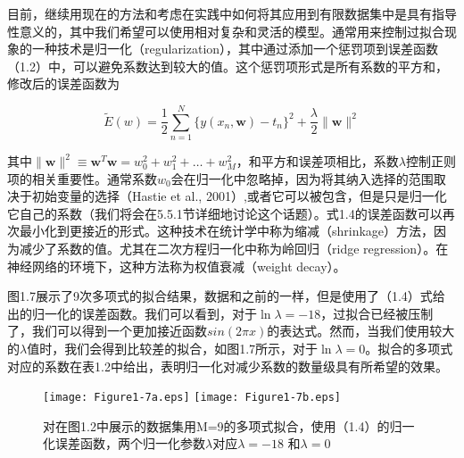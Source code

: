 	目前，继续用现在的方法和考虑在实践中如何将其应用到有限数据集中是具有指导性意义的，其中我们希望可以使用相对复杂和灵活的模型。通常用来控制过拟合现象的一种技术是归一化（regularization），其中通过添加一个惩罚项到误差函数（1.2）中，可以避免系数达到较大的值。这个惩罚项形式是所有系数的平方和，修改后的误差函数为
	
	\begin{equation}
	\tilde{E}(w) = \frac{1}{2} \sum_{n = 1}^{N}\{ y(x_n,\mathbf{w}) - t_n\}^2 + \frac{\lambda}{2} \parallel \mathbf{w} \parallel^2
	\end{equation}
	
	其中$\parallel \mathbf{w} \parallel^2 \equiv \mathbf{w}^T\mathbf{w} = w_0^2 + w_1^2 + \dots +w_M^2 $，和平方和误差项相比，系数$\lambda$控制正则项的相关重要性。通常系数$w_0$会在归一化中忽略掉，因为将其纳入选择的范围取决于初始变量的选择（Hastie et al., 2001）,或者它可以被包含，但是只是归一化它自己的系数（我们将会在5.5.1节详细地讨论这个话题）。式1.4的误差函数可以再次最小化到更接近的形式。这种技术在统计学中称为缩减（shrinkage）方法，因为减少了系数的值。尤其在二次方程归一化中称为岭回归（ridge regression）。在神经网络的环境下，这种方法称为权值衰减（weight decay）。
	
	图1.7展示了9次多项式的拟合结果，数据和之前的一样，但是使用了（1.4）式给出的归一化的误差函数。我们可以看到，对于$\ln \lambda = -18$，过拟合已经被压制了，我们可以得到一个更加接近函数$sin(2 \pi x)$的表达式。然而，当我们使用较大的$\lambda$值时，我们会得到比较差的拟合，如图1.7所示，对于$\ln \lambda = 0$。拟合的多项式对应的系数在表1.2中给出，表明归一化对减少系数的数量级具有所希望的效果。
	
	\begin{figure}
		
		\texttt{[image: Figure1-7a.eps]}
		\texttt{[image: Figure1-7b.eps]}
		
		\caption{对在图1.2中展示的数据集用M=9的多项式拟合，使用（1.4）的归一化误差函数，两个归一化参数$\lambda$对应$\lambda = -18$ 和$\lambda = 0$} 
		\label{fig:endb-flow} 
	\end{figure}
	
